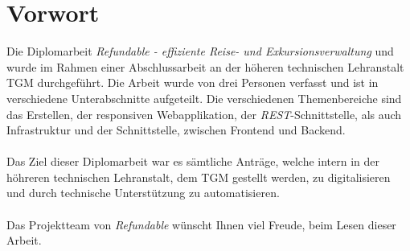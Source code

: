 \chapter{Vorwort}
Die Diplomarbeit \textit{Refundable - effiziente Reise- und Exkursionsverwaltung} und wurde im Rahmen einer Abschlussarbeit an der höheren technischen Lehranstalt TGM durchgeführt. Die Arbeit wurde von drei Personen verfasst und ist in verschiedene Unterabschnitte aufgeteilt. Die verschiedenen Themenbereiche sind das Erstellen, der responsiven Webapplikation, der \textit{REST}-Schnittstelle, als auch Infrastruktur und der Schnittstelle, zwischen Frontend und Backend.\\
~\\
Das Ziel dieser Diplomarbeit war es sämtliche Anträge, welche intern in der höhreren technischen Lehranstalt, dem TGM gestellt werden, zu digitalisieren und durch technische Unterstützung zu automatisieren.\\
~\\
Das Projektteam von \textit{Refundable} wünscht Ihnen viel Freude, beim Lesen dieser Arbeit.